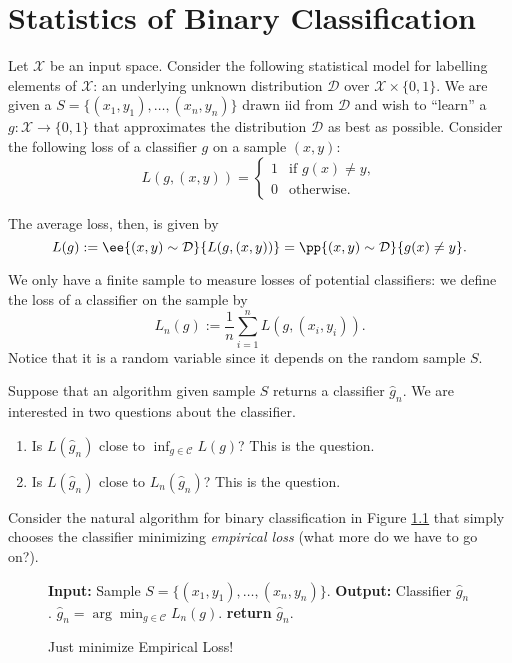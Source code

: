 \chapter{Statistics of Binary Classification}

Let $\mathcal{X}$ be an input space. Consider the following statistical model for labelling elements of $\mathcal X$: an underlying unknown distribution $\mathcal{D}$ over $\mathcal{X} \times \{0, 1\}$. We are given a  $S = \{(x_1, y_1), \ldots, (x_n, y_n)\}$ drawn iid from $\mathcal D$ and wish to ``learn'' a  $g : \mathcal{X} \to \{0, 1\}$ that approximates the distribution $\mathcal{D}$ as best as possible. Consider the following loss of a classifier $g$ on a sample $(x,y)$:
\[
    L(g, (x, y)) = \begin{cases}
        1 & \text{if } g(x) \neq y, \\
        0 & \text{otherwise}.
    \end{cases}
\]

The average loss, then, is given by
\[
    L(g) := \ee{(x,y)\sim\mathcal D}{L(g, (x,y))} = \pp{(x,y)\sim\mathcal D}{g(x) \neq y}.
\]

We only have a finite sample to measure losses of potential classifiers: we define the  loss of a classifier on the sample by
\[
    L_n(g) := \frac{1}{n} \sum_{i=1}^n L(g, (x_i, y_i)). 
\]
Notice that it is a random variable since it depends on the random sample $S$.

Suppose that an algorithm given sample $S$ returns a classifier $\widehat{g}_n$. We are interested in two questions about the classifier.

\begin{enumerate}
    \item Is $L(\widehat{g}_n)$ close to $\displaystyle{\inf_{g\in\mathcal C}L(g)}$? This is the  question.
    \item Is $L(\widehat{g}_n)$ close to $L_n(\widehat{g}_n)$? This is the  question.
\end{enumerate}

Consider the natural algorithm for binary classification in Figure \ref{alg:min-emp-loss} that simply chooses the classifier minimizing \emph{empirical loss} (what more do we have to go on?).

\begin{figure}[!h]
    \label{alg:min-emp-loss}
    \begin{algorithm}[H]
        \begin{algorithmic}[1]
            \State \textbf{Input:} Sample $S = \{(x_1, y_1), \ldots, (x_n, y_n)\}$.
            \State \textbf{Output:} Classifier $\widehat{g}_n$.
            \State $\widehat{g}_n = \arg\min_{g\in\mathcal C} L_n(g)$.
            \State \textbf{return} $\widehat{g}_n$.
        \end{algorithmic}
    \end{algorithm}    
    \caption{Just minimize Empirical Loss!}
\end{figure}

